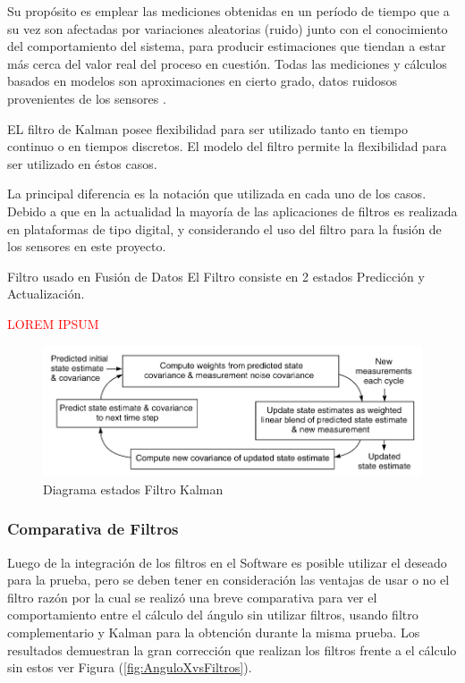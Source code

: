 \documentclass[12pt,a4paper]{article}
\begin{document}
Su propósito es emplear las mediciones obtenidas en un período de tiempo que a su vez son afectadas por variaciones  aleatorias (ruido) junto con el conocimiento del comportamiento del sistema, para producir estimaciones que tiendan a estar más cerca del valor real del proceso en cuestión. Todas las mediciones y cálculos basados en modelos son aproximaciones en cierto grado, datos ruidosos provenientes de los sensores \cite[Capítulo 3, p.~45]{TesisUSM}. 

EL filtro de Kalman posee flexibilidad para ser utilizado tanto en tiempo continuo o en tiempos discretos. El modelo del filtro permite la flexibilidad para ser utilizado en éstos casos.

La principal diferencia es la notación que utilizada en cada uno de los casos.
Debido a que en la actualidad la mayoría de las aplicaciones de filtros es realizada en plataformas de tipo digital, y considerando el uso del filtro para la fusión de los sensores en este proyecto.

Filtro usado en Fusión de Datos \cite{mau_how_2005} 
El Filtro consiste en 2 estados Predicción y Actualización.

\textcolor{red}{LOREM IPSUM}

\begin{figure}[H]
	\centering
	\includegraphics[scale=0.5]{images/kalman-filter.png} 
	\caption{Diagrama estados Filtro Kalman}
	\label{fig:diagramakalman}
\end{figure}


\subsubsection{Comparativa de Filtros}
Luego de la integración de los filtros en el Software es posible utilizar el deseado para la prueba, pero se deben tener en consideración las ventajas de usar o no el filtro razón por la cual se realizó una breve comparativa para ver el comportamiento entre el cálculo del ángulo sin utilizar filtros, usando filtro complementario y Kalman para la obtención durante la misma prueba.
Los resultados demuestran la gran corrección que realizan los filtros frente a el cálculo sin estos ver Figura (\ref{fig:AnguloXvsFiltros}).
\end{document}
